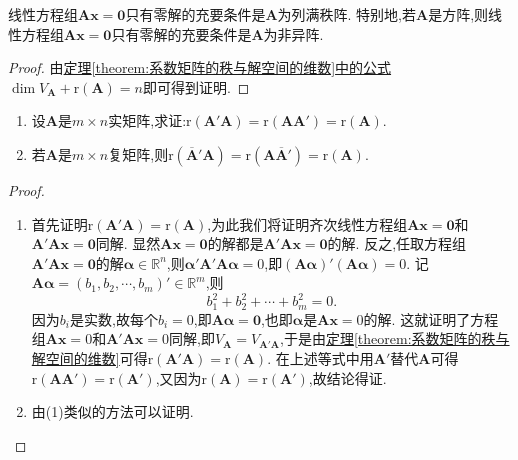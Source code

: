 \documentclass[lang=cn,newtx,10pt,scheme=chinese]{elegantbook}
\begin{document}
\begin{corollary}\label{corollary:线性方程组只有零解的充要条件}
线性方程组\(\boldsymbol{A}\boldsymbol{x}=\boldsymbol{0}\)只有零解的充要条件是\(\boldsymbol{A}\)为列满秩阵. 特别地,若\(\boldsymbol{A}\)是方阵,则线性方程组\(\boldsymbol{A}\boldsymbol{x}=\boldsymbol{0}\)只有零解的充要条件是\(\boldsymbol{A}\)为非异阵. 
\end{corollary}
\begin{proof}
由\hyperref[theorem:系数矩阵的秩与解空间的维数]{定理\ref{theorem:系数矩阵的秩与解空间的维数}中的公式}\(\dim V_{\boldsymbol{A}}+\mathrm{r}(\boldsymbol{A}) = n\)即可得到证明.
\end{proof}


\begin{proposition}\label{proposition:r(AA')=r(A)}
\begin{enumerate}[(1)]
\item 设\(\boldsymbol{A}\)是\(m\times n\)实矩阵,求证:\(\mathrm{r}(\boldsymbol{A}'\boldsymbol{A})=\mathrm{r}(\boldsymbol{A}\boldsymbol{A}')=\mathrm{r}(\boldsymbol{A})\).

\item 若\(\boldsymbol{A}\)是\(m\times n\)复矩阵,则\(\mathrm{r}\left(\overline{\boldsymbol{A}}'\boldsymbol{A}\right)=\mathrm{r}\left(\boldsymbol{A}\overline{\boldsymbol{A}}'\right)=\mathrm{r}(\boldsymbol{A})\).
\end{enumerate}
\end{proposition}
\begin{proof}
\begin{enumerate}[(1)]
\item 首先证明\(\mathrm{r}(\boldsymbol{A}'\boldsymbol{A})=\mathrm{r}(\boldsymbol{A})\),为此我们将证明齐次线性方程组\(\boldsymbol{A}\boldsymbol{x}=\boldsymbol{0}\)和\(\boldsymbol{A}'\boldsymbol{A}\boldsymbol{x}=\boldsymbol{0}\)同解. 显然\(\boldsymbol{A}\boldsymbol{x}=\boldsymbol{0}\)的解都是\(\boldsymbol{A}'\boldsymbol{A}\boldsymbol{x}=\boldsymbol{0}\)的解. 反之,任取方程组\(\boldsymbol{A}'\boldsymbol{A}\boldsymbol{x}=\boldsymbol{0}\)的解\(\boldsymbol{\alpha}\in\mathbb{R}^n\),则\(\boldsymbol{\alpha}'\boldsymbol{A}'\boldsymbol{A}\boldsymbol{\alpha}=0\),即\((\boldsymbol{A}\boldsymbol{\alpha})'(\boldsymbol{A}\boldsymbol{\alpha}) = 0\). 记\(\boldsymbol{A}\boldsymbol{\alpha}=(b_1,b_2,\cdots,b_m)'\in\mathbb{R}^m\),则
\[
b_1^2 + b_2^2+\cdots + b_m^2 = 0.
\]
因为\(b_i\)是实数,故每个\(b_i = 0\),即\(\boldsymbol{A}\boldsymbol{\alpha}=\boldsymbol{0}\),也即\(\boldsymbol{\alpha}\)是\(\boldsymbol{A}\boldsymbol{x}=0\)的解. 这就证明了方程组\(\boldsymbol{A}\boldsymbol{x}=0\)和\(\boldsymbol{A}'\boldsymbol{A}\boldsymbol{x}=0\)同解,即\(V_{\boldsymbol{A}}=V_{\boldsymbol{A}'\boldsymbol{A}}\),于是由\hyperref[theorem:系数矩阵的秩与解空间的维数]{定理\ref{theorem:系数矩阵的秩与解空间的维数}}可得\(\mathrm{r}(\boldsymbol{A}'\boldsymbol{A})=\mathrm{r}(\boldsymbol{A})\). 在上述等式中用\(\boldsymbol{A}'\)替代\(\boldsymbol{A}\)可得\(\mathrm{r}(\boldsymbol{A}\boldsymbol{A}')=\mathrm{r}(\boldsymbol{A}')\),又因为\(\mathrm{r}(\boldsymbol{A})=\mathrm{r}(\boldsymbol{A}')\),故结论得证.

\item 由(1)类似的方法可以证明.
\end{enumerate}
\end{proof}
\end{document}
